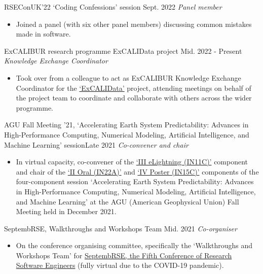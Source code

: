 \begin{projects}
\projecta
	{RSEConUK'22 `Coding Confessions' session \lbrack\href{https://www.youtube.com/watch?v=0BGYOYj7OjQ}{\small{\videoSymbol}}\rbrack}{Sept. 2022}
	{
	    \textit{Panel member}
	}
	{
    \begin{itemize}
        \item Joined a panel (with six other panel members) discussing common mistakes made in software.
    \end{itemize}}

\projecta
	{ExCALIBUR research programme ExCALIData project \lbrack\href{https://excalibur.ac.uk/}{\small{\websiteSymbol}}\rbrack}{Mid. 2022 - Present}
	{
	    \textit{Knowledge Exchange Coordinator}
	}
	{\begin{itemize}
     \item Took over from a colleague to act as ExCALIBUR Knowledge Exchange Coordinator for the \href{https://excalibur.ac.uk/projects/excalidata/}{`ExCALIData'} project, attending meetings on behalf of the project team to coordinate and collaborate with others across the wider programme.
     \end{itemize}}

\projecta
	{AGU Fall Meeting '21, `Accelerating Earth System Predictability: Advances in High-Performance Computing, Numerical Modeling, Artificial Intelligence, and Machine Learning' session}{Late 2021}
	{
	    \textit{Co-convener and chair}
	}
	{\begin{itemize}
     \item In virtual capacity, co-convener of the \href{https://agu.confex.com/agu/fm21/meetingapp.cgi/Session/152558}{`III eLightning (IN11C)'} component and chair of the \href{https://agu.confex.com/agu/fm21/meetingapp.cgi/Session/132759}{`II Oral (IN22A)'} and \href{https://agu.confex.com/agu/fm21/meetingapp.cgi/Session/129326}{`IV Poster (IN15C)'} components of the four-component session `Accelerating Earth System Predictability: Advances in High-Performance Computing, Numerical Modeling, Artificial Intelligence, and Machine Learning' at the AGU (American Geophysical Union) Fall Meeting held in December 2021.
     \end{itemize}}

\projecta
	{SeptembRSE, Walkthroughs and Workshops Team \lbrack\href{https://septembrse.society-rse.org/committee/}{\small{\websiteSymbol}}\rbrack}{Mid. 2021}
	{
	    \textit{Co-organiser}
	}
	{\begin{itemize}
     \item On the conference organising committee, specifically the `Walkthroughs and Workshops Team' for \href{https://septembrse.society-rse.org/}{SeptembRSE, the Fifth Conference of Research Software Engineers} (fully virtual due to the COVID-19 pandemic).
     \end{itemize}}


\end{projects}
